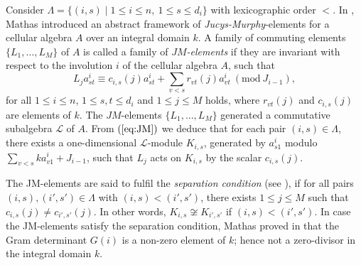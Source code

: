 \documentclass[oneside, a4paper, 11pt]{amsart}
\newcommand{\cL}{\mathcal{L}}
\begin{document}
Consider $\Lambda = \{ (i,s) \mid 1\leq i \leq n, \: 1\leq s \leq d_i\}$ with lexicographic order $<$.  In \cite{Mathas}, Mathas introduced an abstract framework of \emph{Jucys-Murphy}-elements for a cellular algebra $A$ over an integral domain $k$. A family of commuting elements $\{L_1, \ldots, L_M\}$ of $A$ is called a family of \emph{$JM$-elements} if they are invariant with respect to the involution $i$ of the cellular algebra $A$, such that
\begin{equation}\label{eq:JM}
L_j a_{st}^i \equiv c_{i,s}(j) a_{st}^i + \sum_{v<s} r_{vt}(j) a_{vt}^i \: (\mathrm{mod} \: J_{i-1}),
\end{equation}
for all $1\leq i \leq n$, $1\leq s,t \leq d_i$ and $1\leq j \leq M$ holds, where $r_{vt}(j)$ and $c_{i,s}(j)$ are elements of $k$.
The $JM$-elements $\{L_1, \ldots, L_M\}$  generated a commutative subalgebra $\cL$ of $A$. From $(\ref{eq:JM})$ we deduce that for each pair $(i,s)\in \Lambda$, there exists a one-dimensional $\cL$-module  $K_{i,s}$, generated by $a_{s1}^i$ modulo $\sum_{v<s} ka_{v1}^i + J_{i-1}$, such that $L_j$ acts on $K_{i,s}$ by the scalar $c_{i,s}(j)$.

The JM-elements are said to fulfil the \emph{separation condition} (see \cite[Definition 2.8]{Mathas}),  if for all pairs $(i,s), (i',s') \in \Lambda$ with $(i,s)<(i',s')$, there exists $1\leq j \leq M$ such that $c_{i,s}(j)\neq c_{i',s'}(j)$.  In other words, $K_{i,s}\not\cong K_{i',s'}$ if  $(i,s)<(i',s')$. In case the JM-elements satisfy the separation condition, Mathas proved in \cite[Corollary 3.9, Theorem 3.12, Proposition 3.14]{Mathas} that the Gram determinant $G(i)$ is a non-zero element of $k$; hence not a zero-divisor in the integral domain $k$.
\end{document}
